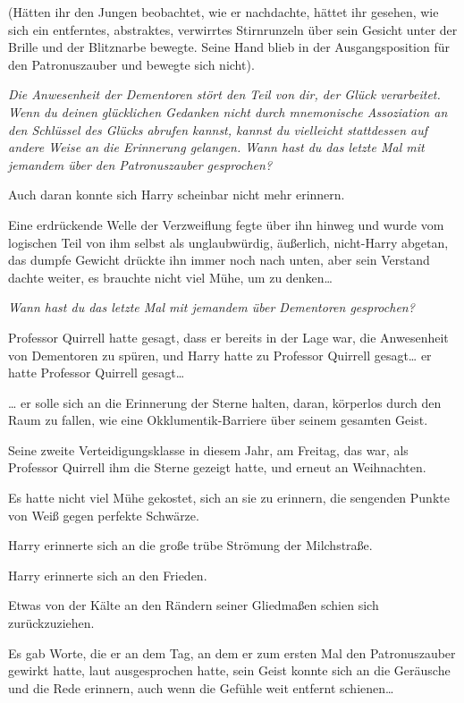{(Hätten ihr den Jungen beobachtet, wie er nachdachte, hättet ihr gesehen, wie sich ein entferntes, abstraktes, verwirrtes Stirnrunzeln über sein Gesicht unter der Brille und der Blitznarbe bewegte. Seine Hand blieb in der Ausgangsposition für den Patronuszauber und bewegte sich nicht).

\emph{Die Anwesenheit der Dementoren stört den Teil von dir, der Glück verarbeitet. Wenn du deinen glücklichen Gedanken nicht durch mnemonische Assoziation an den Schlüssel des Glücks abrufen kannst, kannst du vielleicht stattdessen auf andere Weise an die Erinnerung gelangen. Wann hast du das letzte Mal mit jemandem über den Patronuszauber gesprochen?}

Auch daran konnte sich Harry scheinbar nicht mehr erinnern.

Eine erdrückende Welle der Verzweiflung fegte über ihn hinweg und wurde vom logischen Teil von ihm selbst als unglaubwürdig, äußerlich, nicht-Harry abgetan, das dumpfe Gewicht drückte ihn immer noch nach unten, aber sein Verstand dachte weiter, es brauchte nicht viel Mühe, um zu denken…

\emph{Wann hast du das letzte Mal mit jemandem über Dementoren gesprochen?}

Professor Quirrell hatte gesagt, dass er bereits in der Lage war, die Anwesenheit von Dementoren zu spüren, und Harry hatte zu Professor Quirrell gesagt… er hatte Professor Quirrell gesagt…

… er solle sich an die Erinnerung der Sterne halten, daran, körperlos durch den Raum zu fallen, wie eine Okklumentik-Barriere über seinem gesamten Geist.

Seine zweite Verteidigungsklasse in diesem Jahr, am Freitag, das war, als Professor Quirrell ihm die Sterne gezeigt hatte, und erneut an Weihnachten.

Es hatte nicht viel Mühe gekostet, sich an sie zu erinnern, die sengenden Punkte von Weiß gegen perfekte Schwärze.

Harry erinnerte sich an die große trübe Strömung der Milchstraße.

Harry erinnerte sich an den Frieden.

Etwas von der Kälte an den Rändern seiner Gliedmaßen schien sich zurückzuziehen.

Es gab Worte, die er an dem Tag, an dem er zum ersten Mal den Patronuszauber gewirkt hatte, laut ausgesprochen hatte, sein Geist konnte sich an die Geräusche und die Rede erinnern, auch wenn die Gefühle weit entfernt schienen…

}
